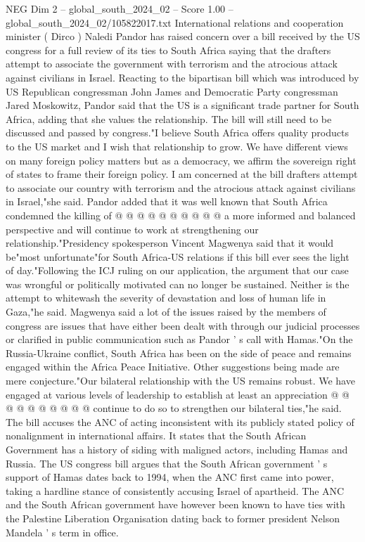 \begin{textsample}{NEG Dim 2 – global\_south\_2024\_02 – Score 1.00 – global\_south\_2024\_02/105822017.txt}  \label{ex:f2_neg_246}
International relations and cooperation minister ( Dirco ) Naledi Pandor has raised concern over a bill received by the US congress for a full review of its ties to South Africa saying that the drafters attempt to associate the government with terrorism and the atrocious attack against civilians in Israel.
Reacting to the bipartisan bill which was introduced by US Republican congressman John James and Democratic Party congressman Jared Moskowitz, Pandor said that the US is a significant trade partner for South Africa, adding that she values the relationship.
The bill will still need to be discussed and passed by congress."I believe South Africa offers quality products to the US market and I wish that relationship to grow.
We have different views on many foreign policy matters but as a democracy, we affirm the sovereign right of states to frame their foreign policy.
I am concerned at the bill drafters attempt to associate our country with terrorism and the atrocious attack against civilians in Israel,"she said.
Pandor added that it was well known that South Africa condemned the killing of @ @ @ @ @ @ @ @ @ @ a more informed and balanced perspective and will continue to work at strengthening our relationship."Presidency spokesperson Vincent Magwenya said that it would be"most unfortunate"for South Africa-US relations if this bill ever sees the light of day."Following the ICJ ruling on our application, the argument that our case was wrongful or politically motivated can no longer be sustained.
Neither is the attempt to whitewash the severity of devastation and loss of human life in Gaza,"he said.
Magwenya said a lot of the issues raised by the members of congress are issues that have either been dealt with through our judicial processes or clarified in public communication such as Pandor ' s call with Hamas."On the Russia-Ukraine conflict, South Africa has been on the side of peace and remains engaged within the Africa Peace Initiative.
Other suggestions being made are mere conjecture."Our bilateral relationship with the US remains robust.
We have engaged at various levels of leadership to establish at least an appreciation @ @ @ @ @ @ @ @ @ @ continue to do so to strengthen our bilateral ties,"he said.
The bill accuses the ANC of acting inconsistent with its publicly stated policy of nonalignment in international affairs.
It states that the South African Government has a history of siding with maligned actors, including Hamas and Russia.
The US congress bill argues that the South African government ' s support of Hamas dates back to 1994, when the ANC first came into power, taking a hardline stance of consistently accusing Israel of apartheid.
The ANC and the South African government have however been known to have ties with the Palestine Liberation Organisation dating back to former president Nelson Mandela ' s term in office.

\end{textsample}
